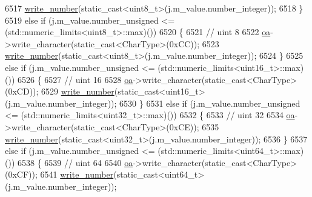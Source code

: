 \begin{DoxyCode}
6517                         \hyperlink{classnlohmann_1_1detail_1_1binary__writer_a62cfd50a511371e718f37ad7bb29ae9d}{write\_number}(static\_cast<uint8\_t>(j.m\_value.number\_integer));
6518                     \}
6519                     \textcolor{keywordflow}{else} \textcolor{keywordflow}{if} (j.m\_value.number\_unsigned <= (std::numeric\_limits<uint8\_t>::max)())
6520                     \{
6521                         \textcolor{comment}{// uint 8}
6522                         \hyperlink{classnlohmann_1_1detail_1_1binary__writer_a6f15b782a7900f50ef37d123008e601b}{oa}->write\_character(static\_cast<CharType>(0xCC));
6523                         \hyperlink{classnlohmann_1_1detail_1_1binary__writer_a62cfd50a511371e718f37ad7bb29ae9d}{write\_number}(static\_cast<uint8\_t>(j.m\_value.number\_integer));
6524                     \}
6525                     \textcolor{keywordflow}{else} \textcolor{keywordflow}{if} (j.m\_value.number\_unsigned <= (std::numeric\_limits<uint16\_t>::max)())
6526                     \{
6527                         \textcolor{comment}{// uint 16}
6528                         \hyperlink{classnlohmann_1_1detail_1_1binary__writer_a6f15b782a7900f50ef37d123008e601b}{oa}->write\_character(static\_cast<CharType>(0xCD));
6529                         \hyperlink{classnlohmann_1_1detail_1_1binary__writer_a62cfd50a511371e718f37ad7bb29ae9d}{write\_number}(static\_cast<uint16\_t>(j.m\_value.number\_integer));
6530                     \}
6531                     \textcolor{keywordflow}{else} \textcolor{keywordflow}{if} (j.m\_value.number\_unsigned <= (std::numeric\_limits<uint32\_t>::max)())
6532                     \{
6533                         \textcolor{comment}{// uint 32}
6534                         \hyperlink{classnlohmann_1_1detail_1_1binary__writer_a6f15b782a7900f50ef37d123008e601b}{oa}->write\_character(static\_cast<CharType>(0xCE));
6535                         \hyperlink{classnlohmann_1_1detail_1_1binary__writer_a62cfd50a511371e718f37ad7bb29ae9d}{write\_number}(static\_cast<uint32\_t>(j.m\_value.number\_integer));
6536                     \}
6537                     \textcolor{keywordflow}{else} \textcolor{keywordflow}{if} (j.m\_value.number\_unsigned <= (std::numeric\_limits<uint64\_t>::max)())
6538                     \{
6539                         \textcolor{comment}{// uint 64}
6540                         \hyperlink{classnlohmann_1_1detail_1_1binary__writer_a6f15b782a7900f50ef37d123008e601b}{oa}->write\_character(static\_cast<CharType>(0xCF));
6541                         \hyperlink{classnlohmann_1_1detail_1_1binary__writer_a62cfd50a511371e718f37ad7bb29ae9d}{write\_number}(static\_cast<uint64\_t>(j.m\_value.number\_integer));

\end{DoxyCode}
